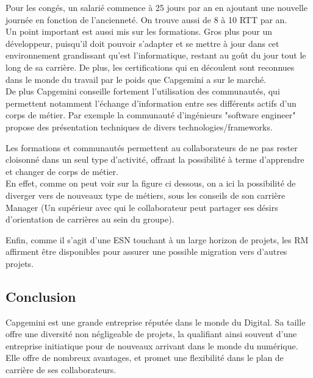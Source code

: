 \documentclass{rapport}
\begin{document}
Pour les congés, un salarié commence à 25 jours par an en ajoutant une nouvelle journée en fonction de l'ancienneté. On trouve aussi de 8 à 10 RTT par an.\\

Un point important est aussi mis sur les formations. Gros plus pour un développeur, puisqu'il doit pouvoir s'adapter et se mettre à jour dans cet environnement grandissant qu'est l'informatique, restant au goût du jour tout le long de sa carrière. De plus, les certifications qui en découlent sont reconnues dans le monde du travail par le poids que Capgemini a sur le marché.\\

De plus Capgemini conseille fortement l'utilisation des communautés, qui permettent notamment l'échange d'information entre ses différents actifs d'un corps de métier. Par exemple la communauté d'ingénieurs "software engineer" propose des présentation techniques de divers technologies/frameworks.

Les formations et communautés permettent au collaborateurs de ne pas rester cloisonné dans un seul type d'activité, offrant la possibilité à terme d'apprendre et changer de corps de métier.\\

En effet, comme on peut voir sur la figure ci dessous, on a ici la possibilité de diverger vers de nouveaux type de métiers, sous les conseils de son carrière Manager (Un supérieur avec qui le collaborateur peut partager ses désirs d'orientation de carrières au sein du groupe).\\


Enfin, comme il s'agit d'une ESN touchant à un large horizon de projets, les RM affirment être disponibles pour assurer une possible migration vers d'autres projets. 

\subsection{Conclusion}

Capgemini est une grande entreprise réputée dans le monde du Digital. Sa taille offre une diversité non négligeable de projets, la qualifiant ainsi souvent d'une entreprise initiatique pour de nouveaux arrivant dans le monde du numérique.
Elle offre de nombreux avantages, et promet une flexibilité dans le plan de carrière de ses collaborateurs.
\end{document}
